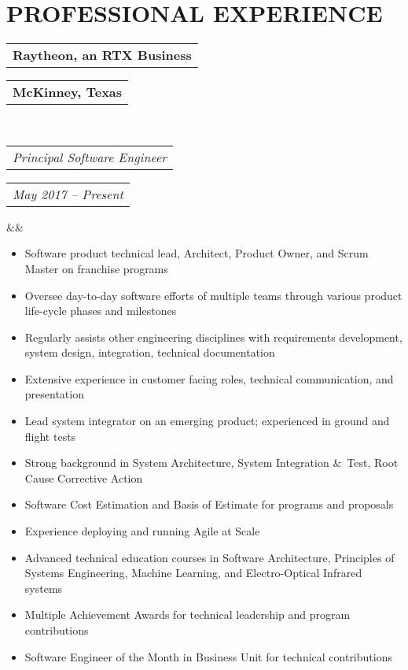 \documentclass[11pt,a4paper,roman]{moderncv}
\makeatletter
\newcommand*{\customcventry}[7][.25em]{
  \begin{tabular}{@{}l} 
    {\bfseries #4}
  \end{tabular}
  \hfill%
  \begin{tabular}{l@{}}
     {\bfseries #5}
  \end{tabular} \\
  \begin{tabular}{@{}l} 
    {\itshape #3}
  \end{tabular}
  \hfill%
  \begin{tabular}{l@{}}
     {\itshape #2}
  \end{tabular}
  \ifx&#7&%
  \else{\\%
    \begin{minipage}{\maincolumnwidth}%
      \small#7%
    \end{minipage}}\fi%
  \par\addvspace{#1}}
\makeatother
\begin{document}
\section{ PROFESSIONAL EXPERIENCE}
{\customcventry{May 2017 – Present}{Principal Software Engineer}{Raytheon, an RTX Business}{McKinney, Texas}{}{}
  {\begin{itemize}
    \item Software product technical lead, Architect, Product Owner, and Scrum Master on franchise programs
    \vspace{1mm}
    \item Oversee day-to-day software efforts of multiple teams through various product life-cycle phases and milestones
    \vspace{1mm}
    \item Regularly assists other engineering disciplines with requirements development, system design, integration, technical documentation
    \vspace{1mm}
    \item Extensive experience in customer facing roles, technical communication, and presentation
    \vspace{1mm}
    \item Lead system integrator on an emerging product; experienced in ground and flight tests
    \vspace{1mm}
    \item Strong background in System Architecture, System Integration \&\ Test, Root Cause Corrective Action
    \vspace{1mm}
    \item Software Cost Estimation and Basis of Estimate for programs and proposals 
    \vspace{1mm}
    \item Experience deploying and running Agile at Scale
    \vspace{1mm}
    \item Advanced technical education courses in Software Architecture, Principles of Systems Engineering, Machine Learning, and Electro-Optical Infrared systems
    \vspace{1mm}
    \item Multiple Achievement Awards for technical leadership and program contributions
    \vspace{1mm}
    \item Software Engineer of the Month in Business Unit for technical contributions
    \vspace{1mm}
\  \end{itemize}
  }
}
\vspace{2mm}
\end{document}
